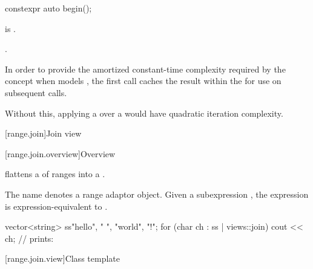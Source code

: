 %
\begin{itemdecl}
constexpr auto begin();
\end{itemdecl}

\begin{itemdescr}
\pnum
\expects
{} is .

\pnum
\returns
{}.

\pnum
\remarks
In order to provide the amortized constant-time complexity
required by the  concept
when  models ,
the first call caches the result within the 
for use on subsequent calls.
\begin{note}
Without this,
applying a  over a 
would have quadratic iteration complexity.
\end{note}
\end{itemdescr}

[range.join]{Join view}

[range.join.overview]{Overview}

\pnum
{} flattens a  of ranges into a
.

\pnum
{}%
The name  denotes a
range adaptor object.
Given a subexpression , the expression
 is expression-equivalent to
.

\pnum
\begin{example}
\begin{codeblock}
vector<string> ss{"hello", " ", "world", "!"};
for (char ch : ss | views::join)
  cout << ch;                                   // prints: 
\end{codeblock}
\end{example}

[range.join.view]{Class template }

